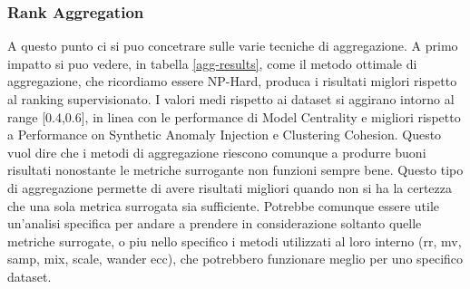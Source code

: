 \newpage
\subsubsection{Rank Aggregation}
A questo punto ci si puo concetrare sulle varie tecniche di aggregazione. A primo impatto si puo vedere, in tabella \ref{agg-results}, come il metodo ottimale di aggregazione, che ricordiamo essere NP-Hard, produca i risultati miglori rispetto al ranking supervisionato. 
I valori medi rispetto ai dataset si aggirano intorno al range [0.4,0.6], in linea con le performance di Model Centrality e migliori rispetto a Performance on Synthetic Anomaly Injection e Clustering Cohesion. Questo vuol dire che i metodi di aggregazione riescono comunque a produrre buoni risultati nonostante le metriche surrogante non funzioni sempre bene. 
Questo tipo di aggregazione permette di avere risultati migliori quando non si ha la certezza che una sola metrica surrogata sia sufficiente. Potrebbe comunque essere utile un'analisi specifica per andare a prendere in considerazione soltanto quelle metriche surrogate, o piu nello specifico i metodi utilizzati al loro interno (rr, mv, samp, mix, scale, wander ecc), che potrebbero funzionare meglio per uno specifico dataset. 


